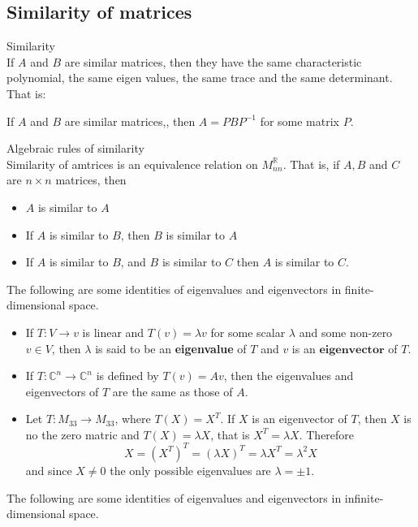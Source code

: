 \documentclass[journal, letterpaper]{IEEEtran}
\begin{document}
    \subsection{Similarity of matrices}
    \begin{mybox}{Similarity} \\ 
        If $A$ and $B$ are similar matrices, then they have the same characteristic polynomial, the same eigen values, the same trace and the same determinant. That is:
        \begin{center}
            If $A$ and $B$ are similar matrices,, then $A = PBP^{-1}$ for some matrix $P$.
        \end{center}
    \end{mybox}
    \begin{myboxr}{Algebraic rules of similarity} \\ 
        Similarity of amtrices is an equivalence relation on $M_{nn}^{\mathbb{R}}$. That is, if $A, B$ and $C$ are $n \times n$ matrices, then
        \begin{itemize}
            \item $A$ is similar to $A$
            \item If $A$ is similar to $B$, then $B$ is similar to $A$
            \item If $A$ is similar to $B$, and $B$ is similar to $C$ then $A$ is similar to $C$.
        \end{itemize}
    \end{myboxr}
    The following are some identities of eigenvalues and eigenvectors in finite-dimensional space.
    \begin{itemize}
        \item If $T : V \to v$ is linear and $T(v) = \lambda v$ for some scalar $\lambda$ and some non-zero $v \in V$, then $\lambda$ is said to be an \textbf{eigenvalue} of $T$ and $v$ is an $\textbf{eigenvector}$ of $T$.
        \item If $T: \mathbb{C}^n \to \mathbb{C}^n$ is defined by $T(v) = Av$, then the eigenvalues and eigenvectors of $T$ are the same as those of $A$.
        \item Let $T: M_{33} \to M_{33}$, where $T(X) = X^T$. If $X$ is an eigenvector of $T$, then $X$ is no the zero matric and $T(X) = \lambda X$, that is $X^T = \lambda X$. Therefore
        $$ X = (X^T)^T = (\lambda X)^T = \lambda X^T = \lambda^2 X$$
        and since $X \ne 0$ the only possible eigenvalues are $\lambda = \pm 1$.
    \end{itemize}
    The following are some identities of eigenvalues and eigenvectors in infinite-dimensional space.
\end{document}

